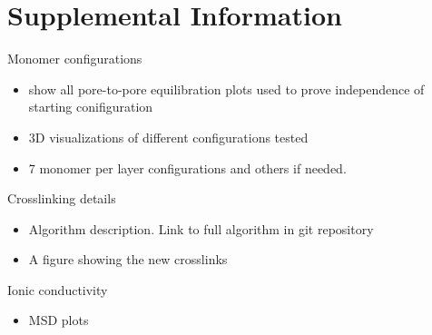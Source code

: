 \documentclass{article}
\begin{document}
	\section{Supplemental Information}
	
	Monomer configurations
	\begin{itemize}
		\item show all pore-to-pore equilibration plots used to prove independence of starting conifiguration
		\item 3D visualizations of different configurations tested
		\item 7 monomer per layer configurations and others if needed.
	\end{itemize}
	
	\noindent Crosslinking details
	\begin{itemize}
		\item Algorithm description. Link to full algorithm in git repository
		\item A figure showing the new crosslinks
	\end{itemize}
	
	\noindent Ionic conductivity %
	\begin{itemize}
		\item MSD plots
	\end{itemize}
\end{document}
